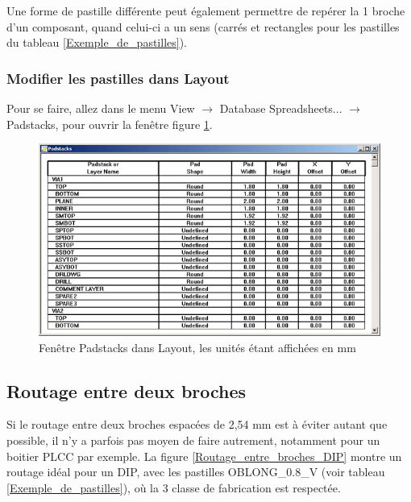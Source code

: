 \documentclass[a4paper]{article}
\begin{document}
Une forme de pastille différente peut également permettre de repérer la 1\iere{} broche d'un composant, quand celui-ci a un sens (carrés et rectangles pour les pastilles du tableau \ref{Exemple_de_pastilles}).

\subsubsection{Modifier les pastilles dans Layout}

Pour se faire, allez dans le menu \og{}View\fg{} $\rightarrow$ \og{}Database Spreadsheets...\fg{} $\rightarrow$ \og{}Padstacks\fg{}, pour ouvrir la fenêtre figure \ref{Padstacks_Layout}.

\begin{figure}[H]
	\centering
	\includegraphics[scale=0.75]{Images/Padstacks_Layout.png}
	\caption{Fenêtre \og{}Padstacks\fg{} dans Layout, les unités étant affichées en mm
		\label{Padstacks_Layout}}
\end{figure}

\subsection{Routage entre deux broches}

Si le routage entre deux broches espacées de 2,54 mm est à éviter autant que possible, il n'y a parfois pas moyen de faire autrement, notamment pour un boitier PLCC par exemple. La figure \ref{Routage_entre_broches_DIP} montre un routage \og{}idéal\fg{} pour un DIP, avec les pastilles \og{}OBLONG\_0.8\_V\fg{} (voir tableau \ref{Exemple_de_pastilles}), où la 3\ieme{} classe de fabrication est respectée.
\end{document}
